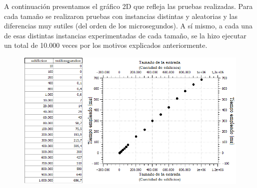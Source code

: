 \documentclass[10pt,a4paper]{article}
\begin{document}
A continuación presentamos el gráfico 2D que refleja las pruebas realizadas. Para cada tamaño se realizaron pruebas con instancias distintas y aleatorias y las diferencias muy sutiles (del orden de los microsegundos). A sí mismo, a cada una de esas distintas instancias experimentadas de cada tamaño, se la hizo ejecutar un total de 10.000 veces por los motivos explicados anteriormente.\\
	\begin{figure}[h]
		\begin{center}
		   \includegraphics[scale=0.75]{Tests/graficoej2backup.png}
		\end{center}
	\end{figure}
\end{document}
